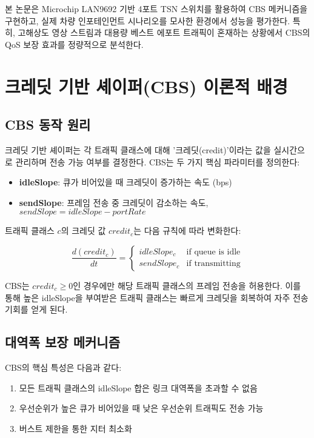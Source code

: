 \documentclass[10pt,twocolumn]{article}
\begin{document}
본 논문은 Microchip LAN9692 기반 4포트 TSN 스위치를 활용하여 CBS 메커니즘을 구현하고, 실제 차량 인포테인먼트 시나리오를 모사한 환경에서 성능을 평가한다. 특히, 고해상도 영상 스트림과 대용량 베스트 에포트 트래픽이 혼재하는 상황에서 CBS의 QoS 보장 효과를 정량적으로 분석한다.

\section{크레딧 기반 셰이퍼(CBS) 이론적 배경}

\subsection{CBS 동작 원리}
크레딧 기반 셰이퍼는 각 트래픽 클래스에 대해 '크레딧(credit)'이라는 값을 실시간으로 관리하며 전송 가능 여부를 결정한다. CBS는 두 가지 핵심 파라미터를 정의한다:

\begin{itemize}
\item \textbf{idleSlope}: 큐가 비어있을 때 크레딧이 증가하는 속도 (bps)
\item \textbf{sendSlope}: 프레임 전송 중 크레딧이 감소하는 속도, $sendSlope = idleSlope - portRate$
\end{itemize}

트래픽 클래스 $c$의 크레딧 값 $credit_c$는 다음 규칙에 따라 변화한다:

\begin{equation}
\frac{d(credit_c)}{dt} = \begin{cases}
idleSlope_c & \text{if queue is idle} \\
sendSlope_c & \text{if transmitting}
\end{cases}
\end{equation}

CBS는 $credit_c \geq 0$인 경우에만 해당 트래픽 클래스의 프레임 전송을 허용한다. 이를 통해 높은 idleSlope을 부여받은 트래픽 클래스는 빠르게 크레딧을 회복하여 자주 전송 기회를 얻게 된다.

\subsection{대역폭 보장 메커니즘}
CBS의 핵심 특성은 다음과 같다:
\begin{enumerate}
\item 모든 트래픽 클래스의 idleSlope 합은 링크 대역폭을 초과할 수 없음
\item 우선순위가 높은 큐가 비어있을 때 낮은 우선순위 트래픽도 전송 가능
\item 버스트 제한을 통한 지터 최소화
\end{enumerate}
\end{document}
